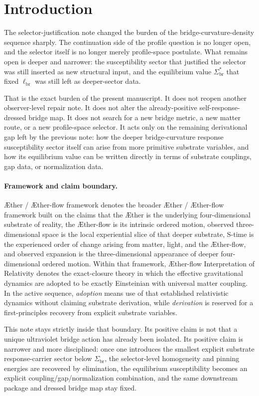 \documentclass[11pt]{article}
\newcommand{\Aether}{\AE{}ther}
\newcommand{\Aflow}{\AE{}ther-flow}
\newcommand{\TheoryName}{\Aflow{} Interpretation of Relativity}
\newcommand{\TheoryProgram}{\Aether{} / \Aflow{} framework}
\newcommand{\CurvScale}{\ell_{\mathrm{br}}}
\newcommand{\RespSus}{\Sigma_{\mathrm{br}}}
\newcommand{\RespSusEq}{\Sigma_{\mathrm{br}}^{\ast}}
\begin{document}
\section{Introduction}

The selector-justification note changed the burden of the bridge-curvature-density sequence sharply. The continuation side of the profile question is no longer open, and the selector itself is no longer merely profile-space postulate. What remains open is deeper and narrower: the susceptibility sector that justified the selector was still inserted as new structural input, and the equilibrium value \(\RespSusEq\) that fixed \(\CurvScale\) was still left as deeper-sector data.

That is the exact burden of the present manuscript. It does not reopen another observer-level repair note. It does not alter the already-positive self-response-dressed bridge map. It does not search for a new bridge metric, a new matter route, or a new profile-space selector. It acts only on the remaining derivational gap left by the previous note: how the deeper bridge-curvature response susceptibility sector itself can arise from more primitive substrate variables, and how its equilibrium value can be written directly in terms of substrate couplings, gap data, or normalization data.

\paragraph{Framework and claim boundary.}
\TheoryProgram{} denotes the broader \Aether{} / \Aflow{} framework built on the claims that the \Aether{} is the underlying four-dimensional substrate of reality, the \Aflow{} is its intrinsic ordered motion, observed three-dimensional space is the local experiential slice of that deeper substrate, S-time is the experienced order of change arising from matter, light, and the \Aflow{}, and observed expansion is the three-dimensional appearance of deeper four-dimensional ordered motion. Within that framework, \TheoryName{} denotes the exact-closure theory in which the effective gravitational dynamics are adopted to be exactly Einsteinian with universal matter coupling. In the active sequence, \emph{adoption} means use of that established relativistic dynamics without claiming substrate derivation, while \emph{derivation} is reserved for a first-principles recovery from explicit substrate variables.

This note stays strictly inside that boundary. Its positive claim is not that a unique ultraviolet bridge action has already been isolated. Its positive claim is narrower and more disciplined: once one introduces the smallest explicit substrate response-carrier sector below \(\RespSus\), the selector-level homogeneity and pinning energies are recovered by elimination, the equilibrium susceptibility becomes an explicit coupling/gap/normalization combination, and the same downstream package and dressed bridge map stay fixed.
\end{document}
